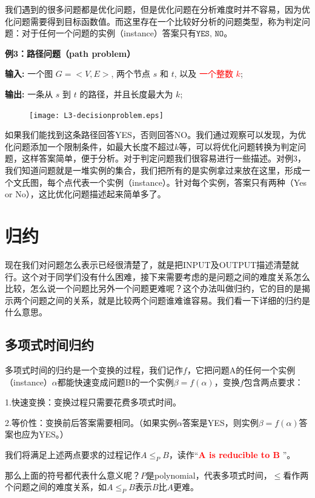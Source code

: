 我们遇到的很多问题都是优化问题，但是优化问题在分析难度时并不容易，因为优化问题需要得到目标函数值。而这里存在一个比较好分析的问题类型，称为判定问题：对于任何一个问题的实例（instance）答案只有$ \texttt{YES, NO} $。

\textbf{例3：路径问题（path problem）}

{\bf 输入:} 一个图 $G=<V,E>$, 两个节点 $s$ 和 $t$, 以及 \textcolor{red}{一个整数 $k$};

{\bf 输出:} 一条从 $s$ 到 $t$ 的路径，并且长度最大为 $k$; 

\begin{figure}[H]
    \centering
    \texttt{[image: L3-decisionproblem.eps]}
\end{figure}

如果我们能找到这条路径回答YES，否则回答NO。我们通过观察可以发现，为优化问题添加一个限制条件，如最大长度不超过$k$等，可以将优化问题转换为判定问题，这样答案简单，便于分析。对于判定问题我们很容易进行一些描述。对例3，我们知道问题就是一堆实例的集合，我们把所有的是实例拿过来放在这里，形成一个文氏图，每个点代表一个实例（instance）。针对每个实例，答案只有两种（Yes or No），这比优化问题描述起来简单多了。

\section{归约}
现在我们对问题怎么表示已经很清楚了，就是把INPUT及OUTPUT描述清楚就行。这个对于同学们没有什么困难，接下来需要考虑的是问题之间的难度关系怎么比较，怎么说一个问题比另外一个问题更难呢？这个办法叫做归约，它的目的是揭示两个问题之间的关系，就是比较两个问题谁难谁容易。我们看一下详细的归约是什么意思。

\subsection{多项式时间归约}

多项式时间的归约是一个变换的过程，我们记作$f$，它把问题A的任何一个实例（instance）$\alpha$都能快速变成问题B的一个实例$\beta=f(\alpha)$，变换$f$包含两点要求：

1.快速变换：变换过程只需要花费多项式时间。

2.等价性：变换前后答案需要相同。（如果实例$\alpha$答案是YES，则实例$\beta=f(\alpha)$答案也应为YES。）

我们将满足上述两点要求的过程记作$A \leq_P B$，读作``\textcolor{red}{\bf A is reducible to  B  }''。

那么上面的符号都代表什么意义呢？$P$是polynomial，代表多项式时间，$\leq$看作两个问题之间的难度关系，如$A \leq_P B$表示$B$比$A$更难。

